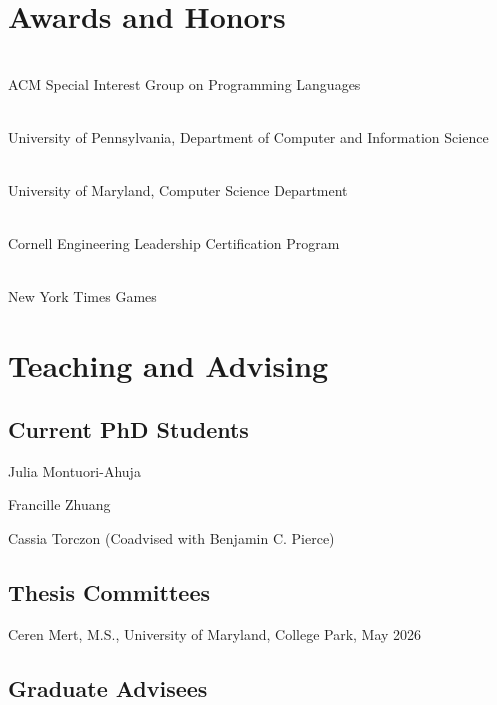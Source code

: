 \documentclass[a4paper]{article}
\begin{document}
\section*{Awards and Honors}

 \\
ACM Special Interest Group on Programming Languages

\bigskip
{} \\
University of Pennsylvania, Department of Computer and Information Science

\bigskip
{} \\
University of Maryland, Computer Science Department

\bigskip
{} \\
Cornell Engineering Leadership Certification Program

\bigskip
{} \\
New York Times Games

\section*{Teaching and Advising}

\subsection*{Current PhD Students}

\noindent Julia Montuori-Ahuja

\bigskip

\noindent Francille Zhuang

\bigskip
\noindent Cassia Torczon (Coadvised with Benjamin C. Pierce)

\subsection*{Thesis Committees}

\noindent Ceren Mert, M.S., University of Maryland, College Park, May 2026

\bigskip

\subsection*{Graduate Advisees}
\end{document}
